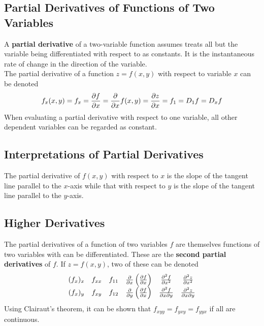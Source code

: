 \documentclass[../Calculus_\Roman{3}]{subfiles}
\begin{document}
		\subsection*{Partial Derivatives of Functions of Two Variables}
			A \textbf{partial derivative} of a two-variable function assumes treats all but the variable being differentiated with respect to as constants. It is the instantaneous rate of change in the direction of the variable. \\
			The partial derivative of a function $z = f(x, y)$ with respect to variable $x$ can be denoted
				\[
					f_x(x, y) = f_x
							= \frac{\partial f}{\partial x}
							= \frac{\partial }{\partial x}f(x, y)
							= \frac{\partial z}{\partial x}
							= f_1
							= D_1f
							= D_xf
				\]
			When evaluating a partial derivative with respect to one variable, all other dependent variables can be regarded as constant.
		\subsection*{Interpretations of Partial Derivatives}
			The partial derivative of $f(x, y)$ with respect to $x$ is the slope of the tangent line parallel to the $x$-axis while that with respect to $y$ is the slope of the tangent line parallel to the $y$-axis.
		\subsection*{Higher Derivatives}
			The partial derivatives of a function of two variables $f$ are themselves functions of two variables with can be differentiated. These are the \textbf{second partial derivatives} of $f$. If $z = f(x, y)$, two of these can be denoted
			\[
				\def\arraystretch{1.4}
				\begin{array}{cccccc}
					(f_x)_x &
						f_{xx} &
						f_{11} &
						\pder{}{x}\left(\pder{f}{x}\right) &
						\pder{^2f}{x^2} &
						\pder{^2z}{x^2} \\
					(f_x)_y &
						f_{xy} &
						f_{12} &
						\pder{}{y}\left(\pder{f}{x}\right) &
						\pder{^2f}{x \partial y} &
						\pder{^2z}{x \partial y}
				\end{array}
			\]
			Using Clairaut's theorem, it can be shown that $f_{xyy} = f_{yxy} = f_{yyx}$ if all are continuous.
\end{document}
